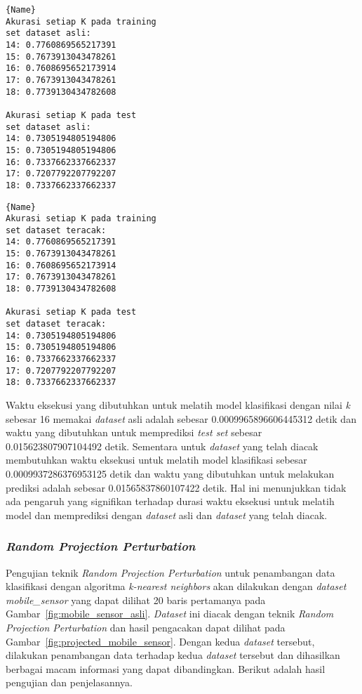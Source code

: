 \noindent\begin{minipage}{.48\textwidth}
	\begin{lstlisting}[caption=\textit{Dataset diabetes} Asli,frame=tlrb, label=diabetes_akurasi_asli]{Name}
Akurasi setiap K pada training 
set dataset asli:
14: 0.7760869565217391
15: 0.7673913043478261
16: 0.7608695652173914
17: 0.7673913043478261
18: 0.7739130434782608

Akurasi setiap K pada test 
set dataset asli: 
14: 0.7305194805194806
15: 0.7305194805194806
16: 0.7337662337662337
17: 0.7207792207792207
18: 0.7337662337662337
	\end{lstlisting}
\end{minipage}\hfill
\begin{minipage}{.48\textwidth}
	\begin{lstlisting}[caption=\textit{Dataset diabetes} Teracak,frame=tlrb, label=diabetes_akurasi_randomisasi]{Name}
Akurasi setiap K pada training 
set dataset teracak: 
14: 0.7760869565217391
15: 0.7673913043478261
16: 0.7608695652173914
17: 0.7673913043478261
18: 0.7739130434782608

Akurasi setiap K pada test 
set dataset teracak: 
14: 0.7305194805194806
15: 0.7305194805194806
16: 0.7337662337662337
17: 0.7207792207792207
18: 0.7337662337662337
	\end{lstlisting}
\end{minipage}
	
Waktu eksekusi yang dibutuhkan untuk melatih model klasifikasi dengan nilai \textit{k} sebesar 16 memakai \textit{dataset} asli adalah sebesar 0.0009965896606445312 detik dan waktu yang dibutuhkan untuk memprediksi \textit{test set} sebesar 0.015623807907104492 detik. Sementara untuk \textit{dataset} yang telah diacak membutuhkan waktu eksekusi untuk melatih model klasifikasi sebesar 0.0009937286376953125 detik dan waktu yang dibutuhkan untuk melakukan prediksi adalah sebesar 0.01565837860107422 detik. Hal ini menunjukkan tidak ada pengaruh yang signifikan terhadap durasi waktu eksekusi untuk melatih model dan memprediksi dengan \textit{dataset} asli dan \textit{dataset} yang telah diacak.

\subsubsection{\textit{Random Projection Perturbation}}
\label{subsubsec:pengujian-klasifikasi-rpp}

Pengujian teknik \textit{Random Projection Perturbation} untuk penambangan data klasifikasi dengan algoritma \textit{k-nearest neighbors} akan dilakukan dengan \textit{dataset} \textit{mobile\_sensor} yang dapat dilihat 20 baris pertamanya pada Gambar~\ref{fig:mobile_sensor_asli}. \textit{Dataset} ini diacak dengan teknik \textit{Random Projection Perturbation} dan hasil pengacakan dapat dilihat pada Gambar~\ref{fig:projected_mobile_sensor}. Dengan kedua \textit{dataset} tersebut, dilakukan penambangan data terhadap kedua \textit{dataset} tersebut dan dihasilkan berbagai macam informasi yang dapat dibandingkan. Berikut adalah hasil pengujian dan penjelasannya.

